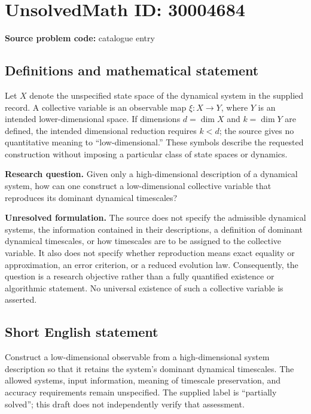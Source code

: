 \documentclass[11pt]{article}
\begin{document}
\section*{UnsolvedMath ID: 30004684}
\textbf{Source problem code:} catalogue entry
\subsection{Definitions and mathematical statement}
Let \(X\) denote the unspecified state space of the dynamical system in the supplied record. A collective variable is an observable map \(\xi:X\to Y\), where \(Y\) is an intended lower-dimensional space. If dimensions \(d=\dim X\) and \(k=\dim Y\) are defined, the intended dimensional reduction requires \(k<d\); the source gives no quantitative meaning to ``low-dimensional.'' These symbols describe the requested construction without imposing a particular class of state spaces or dynamics.

\textbf{Research question.} Given only a high-dimensional description of a dynamical system, how can one construct a low-dimensional collective variable that reproduces its dominant dynamical timescales?

\textbf{Unresolved formulation.} The source does not specify the admissible dynamical systems, the information contained in their descriptions, a definition of dominant dynamical timescales, or how timescales are to be assigned to the collective variable. It also does not specify whether reproduction means exact equality or approximation, an error criterion, or a reduced evolution law. Consequently, the question is a research objective rather than a fully quantified existence or algorithmic statement. No universal existence of such a collective variable is asserted.
\subsection{Short English statement}
Construct a low-dimensional observable from a high-dimensional system description so that it retains the system's dominant dynamical timescales. The allowed systems, input information, meaning of timescale preservation, and accuracy requirements remain unspecified. The supplied label is ``partially solved''; this draft does not independently verify that assessment.
\end{document}
